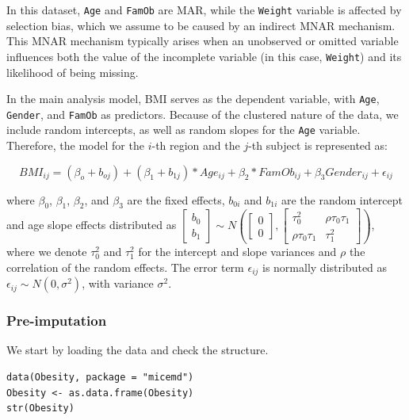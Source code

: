\documentclass[
  article]{jss}
\begin{document}
In this dataset, \texttt{Age} and \texttt{FamOb} are MAR, while the
\texttt{Weight} variable is affected by selection bias, which we assume
to be caused by an indirect MNAR mechanism. This MNAR mechanism
typically arises when an unobserved or omitted variable influences both
the value of the incomplete variable (in this case, \texttt{Weight}) and
its likelihood of being missing.

In the main analysis model, BMI serves as the dependent variable, with
\texttt{Age}, \texttt{Gender}, and \texttt{FamOb} as predictors. Because
of the clustered nature of the data, we include random intercepts, as
well as random slopes for the \texttt{Age} variable. Therefore, the
model for the \(i\)-th region and the \(j\)-th subject is represented
as:

\begin{equation}
\label{eqn-main}
BMI_{ij}= (\beta_{o}+ b_{oj} ) + (\beta_{1}+ b_{1j})* Age_{ij} + \beta_{2}*FamOb_{ij}+ \beta_{3}Gender_{ij} + \epsilon_{ij}
\end{equation}

\noindent where \(\beta_0\), \(\beta_1\), \(\beta_2\), and \(\beta_3\)
are the fixed effects, \(b_{0i}\) and \(b_{1i}\) are the random
intercept and age slope effects distributed as
\(\begin{bmatrix}b_0\\b_1\end{bmatrix}\sim N\left(\begin{bmatrix}0\\0\end{bmatrix},\begin{bmatrix}\tau_0^2 & \rho\tau_0\tau_1\\\rho\tau_0\tau_1 & \tau_1^2\end{bmatrix}\right)\),
where we denote \(\tau_0^2\) and \(\tau_1^2\) for the intercept and
slope variances and \(\rho\) the correlation of the random effects. The
error term \(\epsilon_{ij}\) is normally distributed as
\(\epsilon_{ij}\sim N(0,\sigma^2)\), with variance \(\sigma^2\).

\subsubsection{Pre-imputation}\label{pre-imputation-2}

We start by loading the data and check the structure.

\begin{verbatim}
data(Obesity, package = "micemd")
Obesity <- as.data.frame(Obesity)
str(Obesity)
\end{verbatim}
\end{document}
